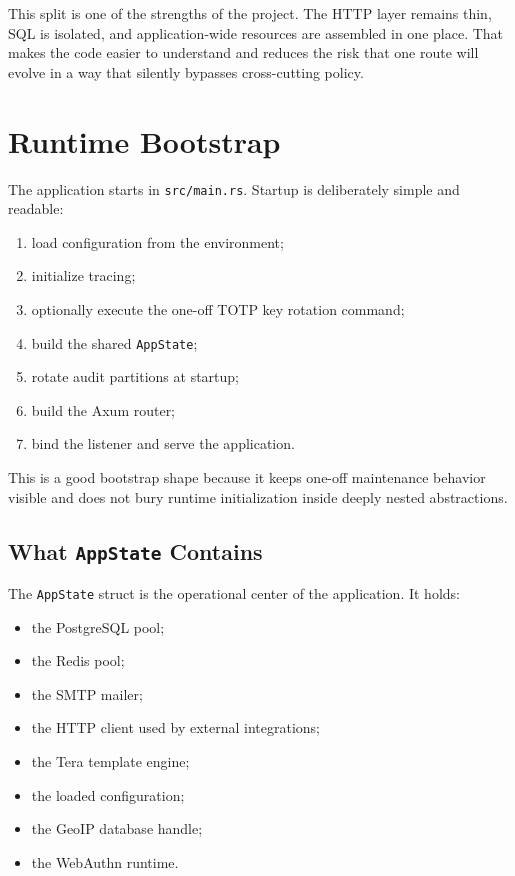 \documentclass[11pt,a4paper]{article}
\begin{document}
This split is one of the strengths of the project. The HTTP layer remains thin, SQL is isolated, and application-wide resources are assembled in one place. That makes the code easier to understand and reduces the risk that one route will evolve in a way that silently bypasses cross-cutting policy.

\section{Runtime Bootstrap}

The application starts in \texttt{src/main.rs}. Startup is deliberately simple and readable:

\begin{enumerate}
  \item load configuration from the environment;
  \item initialize tracing;
  \item optionally execute the one-off TOTP key rotation command;
  \item build the shared \texttt{AppState};
  \item rotate audit partitions at startup;
  \item build the Axum router;
  \item bind the listener and serve the application.
\end{enumerate}

This is a good bootstrap shape because it keeps one-off maintenance behavior visible and does not bury runtime initialization inside deeply nested abstractions.

\subsection{What \texttt{AppState} Contains}

The \texttt{AppState} struct is the operational center of the application. It holds:

\begin{itemize}
  \item the PostgreSQL pool;
  \item the Redis pool;
  \item the SMTP mailer;
  \item the HTTP client used by external integrations;
  \item the Tera template engine;
  \item the loaded configuration;
  \item the GeoIP database handle;
  \item the WebAuthn runtime.
\end{itemize}
\end{document}
